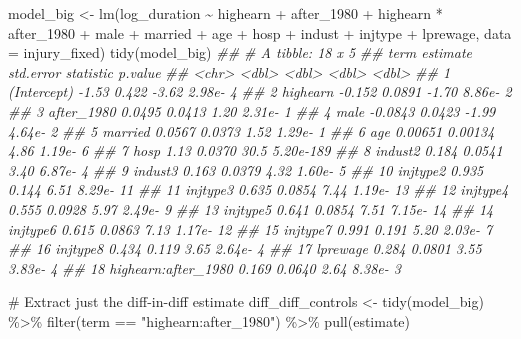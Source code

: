 \documentclass[
  letterpaper,
  DIV=11,
  numbers=noendperiod]{scrartcl}
\newenvironment{Shaded}{\begin{snugshade}}{\end{snugshade}}
\newcommand{\AttributeTok}[1]{\textcolor[rgb]{0.40,0.45,0.13}{#1}}
\newcommand{\CommentTok}[1]{\textcolor[rgb]{0.37,0.37,0.37}{#1}}
\newcommand{\DocumentationTok}[1]{\textcolor[rgb]{0.37,0.37,0.37}{\textit{#1}}}
\newcommand{\FunctionTok}[1]{\textcolor[rgb]{0.28,0.35,0.67}{#1}}
\newcommand{\NormalTok}[1]{\textcolor[rgb]{0.00,0.23,0.31}{#1}}
\newcommand{\OtherTok}[1]{\textcolor[rgb]{0.00,0.23,0.31}{#1}}
\newcommand{\SpecialCharTok}[1]{\textcolor[rgb]{0.37,0.37,0.37}{#1}}
\newcommand{\StringTok}[1]{\textcolor[rgb]{0.13,0.47,0.30}{#1}}
\begin{document}
\begin{Shaded}
\begin{Highlighting}[]
\NormalTok{model\_big }\OtherTok{\textless{}{-}} \FunctionTok{lm}\NormalTok{(log\_duration }\SpecialCharTok{\textasciitilde{}}\NormalTok{ highearn }\SpecialCharTok{+}\NormalTok{ after\_1980 }\SpecialCharTok{+}\NormalTok{ highearn }\SpecialCharTok{*}\NormalTok{ after\_1980 }\SpecialCharTok{+}
\NormalTok{                  male }\SpecialCharTok{+}\NormalTok{ married }\SpecialCharTok{+}\NormalTok{ age }\SpecialCharTok{+}\NormalTok{ hosp }\SpecialCharTok{+}\NormalTok{ indust }\SpecialCharTok{+}\NormalTok{ injtype }\SpecialCharTok{+}\NormalTok{ lprewage,}
                \AttributeTok{data =}\NormalTok{ injury\_fixed)}
\FunctionTok{tidy}\NormalTok{(model\_big)}
\DocumentationTok{\#\# \# A tibble: 18 x 5}
\DocumentationTok{\#\#    term                estimate std.error statistic   p.value}
\DocumentationTok{\#\#    \textless{}chr\textgreater{}                  \textless{}dbl\textgreater{}     \textless{}dbl\textgreater{}     \textless{}dbl\textgreater{}     \textless{}dbl\textgreater{}}
\DocumentationTok{\#\#  1 (Intercept)         {-}1.53      0.422       {-}3.62 2.98e{-}  4}
\DocumentationTok{\#\#  2 highearn            {-}0.152     0.0891      {-}1.70 8.86e{-}  2}
\DocumentationTok{\#\#  3 after\_1980           0.0495    0.0413       1.20 2.31e{-}  1}
\DocumentationTok{\#\#  4 male                {-}0.0843    0.0423      {-}1.99 4.64e{-}  2}
\DocumentationTok{\#\#  5 married              0.0567    0.0373       1.52 1.29e{-}  1}
\DocumentationTok{\#\#  6 age                  0.00651   0.00134      4.86 1.19e{-}  6}
\DocumentationTok{\#\#  7 hosp                 1.13      0.0370      30.5  5.20e{-}189}
\DocumentationTok{\#\#  8 indust2              0.184     0.0541       3.40 6.87e{-}  4}
\DocumentationTok{\#\#  9 indust3              0.163     0.0379       4.32 1.60e{-}  5}
\DocumentationTok{\#\# 10 injtype2             0.935     0.144        6.51 8.29e{-} 11}
\DocumentationTok{\#\# 11 injtype3             0.635     0.0854       7.44 1.19e{-} 13}
\DocumentationTok{\#\# 12 injtype4             0.555     0.0928       5.97 2.49e{-}  9}
\DocumentationTok{\#\# 13 injtype5             0.641     0.0854       7.51 7.15e{-} 14}
\DocumentationTok{\#\# 14 injtype6             0.615     0.0863       7.13 1.17e{-} 12}
\DocumentationTok{\#\# 15 injtype7             0.991     0.191        5.20 2.03e{-}  7}
\DocumentationTok{\#\# 16 injtype8             0.434     0.119        3.65 2.64e{-}  4}
\DocumentationTok{\#\# 17 lprewage             0.284     0.0801       3.55 3.83e{-}  4}
\DocumentationTok{\#\# 18 highearn:after\_1980  0.169     0.0640       2.64 8.38e{-}  3}

\CommentTok{\# Extract just the diff{-}in{-}diff estimate}
\NormalTok{diff\_diff\_controls }\OtherTok{\textless{}{-}} \FunctionTok{tidy}\NormalTok{(model\_big) }\SpecialCharTok{\%\textgreater{}\%}
  \FunctionTok{filter}\NormalTok{(term }\SpecialCharTok{==} \StringTok{"highearn:after\_1980"}\NormalTok{) }\SpecialCharTok{\%\textgreater{}\%}
  \FunctionTok{pull}\NormalTok{(estimate)}
\end{Highlighting}
\end{Shaded}
\end{document}
